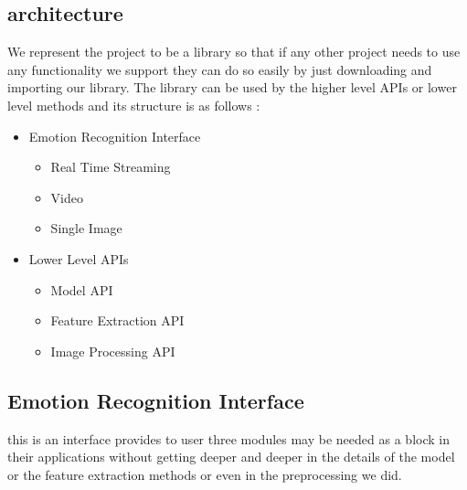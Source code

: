 \subsection{architecture}
We represent the project to be a library so that if any other project needs to use any functionality we support they can do so easily by just downloading and importing our library.
\bigbreak
The library can be used by the higher level APIs or 
lower level methods and its structure is as follows :
\begin{itemize}
	\item Emotion Recognition Interface 
	\begin{itemize}
		\item Real Time Streaming
		\item Video
		\item Single Image
	\end{itemize}
	\item Lower Level APIs
	\begin{itemize}
		\item Model API
		\item Feature Extraction API
		\item Image Processing API
	\end{itemize}
\end{itemize}

\newpage

\begin{center}
	\subsection{Emotion Recognition Interface}
	this is an interface provides to user three modules may be needed as a block in their applications without getting deeper and deeper in the details of the model or the feature extraction methods or even in the preprocessing we did.   
\end{center}
\newpage


